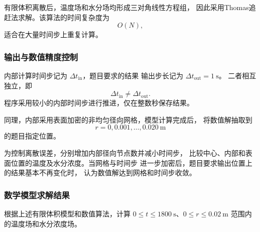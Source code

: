 \documentclass[12pt,a4paper]{article}
\begin{document}
有限体积离散后，温度场和水分场均形成三对角线性方程组，
因此采用Thomas追赶法求解。该算法的时间复杂度为
\begin{equation}
O(N),
\end{equation}
适合在大量时间步上重复计算。

\subsubsection{输出与数值精度控制}

内部计算时间步记为 $\Delta t_{\mathrm{in}}$，题目要求的结果
输出步长记为 $\Delta t_{\mathrm{out}}=1\ \mathrm{s}$。
二者相互独立，即
\begin{equation}
\Delta t_{\mathrm{in}}
\neq
\Delta t_{\mathrm{out}}.
\end{equation}
程序采用较小的内部时间步进行推进，仅在整数秒保存结果。

同理，内部采用表面加密的非均匀径向网格，模型计算完成后，
将数值解抽取到
\begin{equation}
r=0,0.001,\ldots,0.020\ \mathrm{m}
\end{equation}
的题目指定位置。

为控制离散误差，分别增加内部径向节点数并减小时间步，
比较中心、内部和表面位置的温度及水分浓度。当网格与时间步
进一步加密后，题目要求输出位置上的结果基本不再变化时，
认为数值解达到网格和时间步收敛。

\subsubsection{数学模型求解结果}

根据上述有限体积模型和数值算法，计算
$0\le t\le1800\ \mathrm{s}$、$0\le r\le0.02\ \mathrm{m}$
范围内的温度场和水分浓度场。
\end{document}
